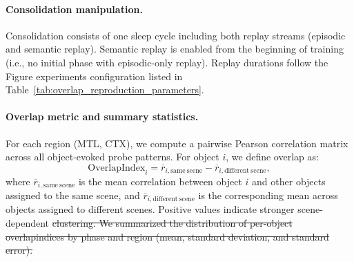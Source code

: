 \documentclass{article}
\providecommand{\DIFdeltex}[1]{{\protect\color{red}\sout{#1}}}                      %
\providecommand{\DIFdelbegin}{} %
\providecommand{\DIFdel}[1]{\texorpdfstring{\DIFdeltex{#1}}{}} %
\begin{document}
\paragraph{Consolidation manipulation.}
Consolidation consists of one sleep cycle including both replay streams (episodic and semantic replay). Semantic replay is enabled from the beginning of training (i.e., no initial phase with episodic-only replay). Replay durations follow the Figure experiments configuration listed in Table~\ref{tab:overlap_reproduction_parameters}.

\paragraph{Overlap metric and summary statistics.}
For each region (MTL, CTX), we compute a pairwise Pearson correlation matrix across all object-evoked probe patterns. For object $i$, we define overlap as:
\begin{equation}
\mathrm{OverlapIndex}_i
=
\overline{r}_{i,\mathrm{same\ scene}}
-
\overline{r}_{i,\mathrm{different\ scene}},
\end{equation}
where $\overline{r}_{i,\mathrm{same\ scene}}$ is the mean correlation between object $i$ and other objects assigned to the same scene, and $\overline{r}_{i,\mathrm{different\ scene}}$ is the corresponding mean across objects assigned to different scenes. Positive values indicate stronger scene-dependent \DIFdelbegin \DIFdel{clustering. We summarized the distribution of per-object overlapindices by phase and region (mean, standard deviation, and standard error).
}%
\end{document}

